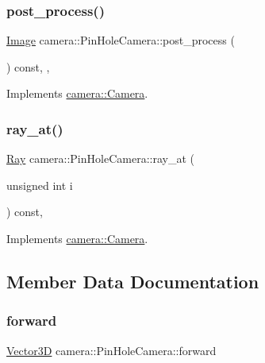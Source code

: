 \subsubsection{\texorpdfstring{post\_process()}{post\_process()}}
{\footnotesize\ttfamily \mbox{\hyperlink{namespacecamera_a7ac4fbfbf1f82c10ad94680fb8113483}{Image}} camera\+::\+Pin\+Hole\+Camera\+::post\+\_\+process (\begin{DoxyParamCaption}{ }\end{DoxyParamCaption}) const\hspace{0.3cm}{\ttfamily [override]}, {\ttfamily [protected]}, {\ttfamily [virtual]}}



Implements \mbox{\hyperlink{classcamera_1_1Camera_a56d942e3c4b51263bd7af3351da15d9f}{camera\+::\+Camera}}.

\mbox{\label{classcamera_1_1PinHoleCamera_ab2457caa55561521cab10490e67ba8c8}} 
\subsubsection{\texorpdfstring{ray\_at()}{ray\_at()}}
{\footnotesize\ttfamily \mbox{\hyperlink{classRay}{Ray}} camera\+::\+Pin\+Hole\+Camera\+::ray\+\_\+at (\begin{DoxyParamCaption}\item[{unsigned int}]{i }\end{DoxyParamCaption}) const\hspace{0.3cm}{\ttfamily [override]}, {\ttfamily [virtual]}}



Implements \mbox{\hyperlink{classcamera_1_1Camera_adf751a32f3b3b9ea5df48affafc39732}{camera\+::\+Camera}}.



\subsection{Member Data Documentation}
\mbox{\label{classcamera_1_1PinHoleCamera_a2db605d2a78469feeda2cff0f01369c8}} 
\subsubsection{\texorpdfstring{forward}{forward}}
{\footnotesize\ttfamily \mbox{\hyperlink{classVector3D}{Vector3D}} camera\+::\+Pin\+Hole\+Camera\+::forward\hspace{0.3cm}{\ttfamily [private]}}

